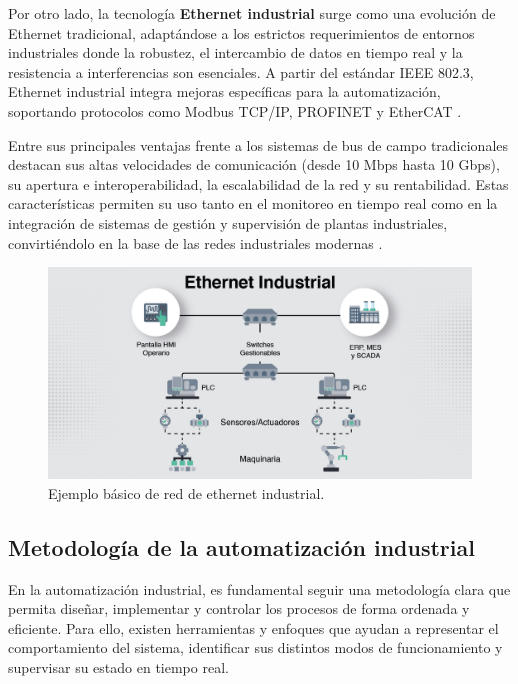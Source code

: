 Por otro lado, la tecnología \textbf{Ethernet industrial} surge como una evolución de Ethernet tradicional, adaptándose a los estrictos requerimientos de entornos industriales donde la robustez, el intercambio de datos en tiempo real y la resistencia a interferencias son esenciales. A partir del estándar IEEE 802.3, Ethernet industrial integra mejoras específicas para la automatización, soportando protocolos como Modbus TCP/IP, PROFINET y EtherCAT \cite{bus_vs_ethernet}.

Entre sus principales ventajas frente a los sistemas de bus de campo tradicionales destacan sus altas velocidades de comunicación (desde 10 Mbps hasta 10 Gbps), su apertura e interoperabilidad, la escalabilidad de la red y su rentabilidad. Estas características permiten su uso tanto en el monitoreo en tiempo real como en la integración de sistemas de gestión y supervisión de plantas industriales, convirtiéndolo en la base de las redes industriales modernas \cite{bus_vs_ethernet}.

\begin{figure} [h!]
  \begin{center}
    \includegraphics[width=15.5cm]{figs/ethernet_industrial}
  \end{center}
  \caption{\centering Ejemplo básico de red de ethernet industrial. \cite{ethernet_imagen}}
  \label{fig:ethernet_industrial}
\end{figure} 


\subsection{Metodología de la automatización industrial}

En la automatización industrial, es fundamental seguir una metodología clara que permita diseñar, implementar y controlar los procesos de forma ordenada y eficiente. Para ello, existen herramientas y enfoques que ayudan a representar el comportamiento del sistema, identificar sus distintos modos de funcionamiento y supervisar su estado en tiempo real.

